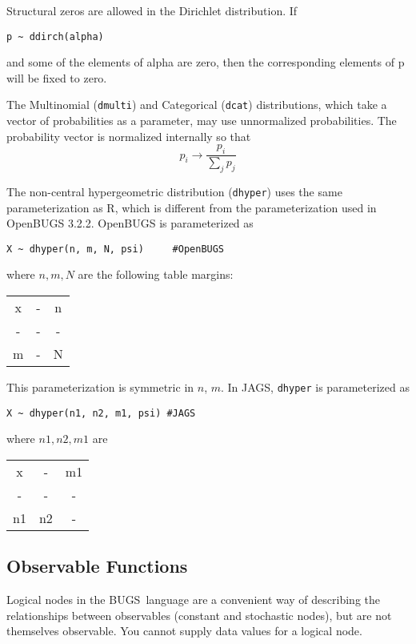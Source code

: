\documentclass[11pt, a4paper, titlepage]{report}
\newcommand{\BUGS}{\textsf{BUGS}}
\begin{document}
Structural zeros are allowed in the Dirichlet distribution. If
\begin{verbatim}
p ~ ddirch(alpha)
\end{verbatim}
and some of the elements of alpha are zero, then the corresponding
elements of p will be fixed to zero.

The Multinomial (\verb+dmulti+) and Categorical (\verb+dcat+)
distributions, which take a vector of probabilities as a parameter,
may use unnormalized probabilities. The probability vector is
normalized internally so that
\[
p_i \rightarrow \frac{p_i}{\sum_j p_j}
\]

The non-central hypergeometric distribution (\verb+dhyper+) uses the
same parameterization as R, which is different from the
parameterization used in OpenBUGS 3.2.2. OpenBUGS is parameterized as
\begin{verbatim}
X ~ dhyper(n, m, N, psi)     #OpenBUGS
\end{verbatim}
where $n, m, N$ are the following table margins:
\begin{center}
\begin{tabular}{|cc|c|}
\hline
x & - & n \\
-  & - & -  \\
\hline
m & - & N \\
\hline
\end{tabular}
\end{center}
This parameterization is symmetric in $n$, $m$. In JAGS, \verb+dhyper+
is parameterized as
\begin{verbatim}
X ~ dhyper(n1, n2, m1, psi) #JAGS 
\end{verbatim}
where $n1, n2, m1$ are
\begin{center}
\begin{tabular}{|cc|c|}
\hline
x & - & m1 \\
-  & - & -   \\
\hline
n1 & n2 & - \\
\hline
\end{tabular}
\end{center}

\subsection{Observable Functions}
\label{section:obfun}

Logical nodes in the \BUGS\ language are a convenient way of
describing the relationships between observables (constant and
stochastic nodes), but are not themselves observable. You cannot
supply data values for a logical node.  
\end{document}
